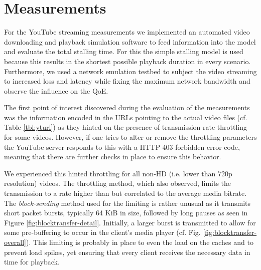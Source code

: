 



\section{Measurements}
\label{sec:measurements}


For the YouTube streaming measurements we implemented an automated video downloading and playback simulation software to feed information into the model and evaluate the total stalling time. For this the simple stalling model is used because this results in the shortest possible playback duration in every scenario. Furthermore, we used a network emulation testbed to subject the video streaming to increased loss and latency while fixing the maximum network bandwidth and observe the influence on the QoE.

The first point of interest discovered during the evaluation of the measurements was the information encoded in the URLs pointing to the actual video files (cf. Table \ref{tbl:yturl}) as they hinted on the presence of transmission rate throttling for some videos. However, if one tries to alter or remove the throttling parameters the YouTube server responds to this with a HTTP 403 forbidden error code, meaning that there are further checks in place to ensure this behavior. 

We experienced this hinted throttling for all non-HD (i.e. lower than 720p resolution) videos. The throttling method, which \cite{alcock2011afcyt} also observed, limits the transmission to a rate higher than but correlated to the average media bitrate. The \textit{block-sending} method used for the limiting is rather unusual as it transmits short packet bursts, typically 64 KiB in size, followed by long pauses as seen in Figure \ref{fig:blocktransfer-detail}. Initially, a larger burst is transmitted to allow for some pre-buffering to occur in the client's media player (cf. Fig. \ref{fig:blocktransfer-overall}). This limiting is probably in place to even the load on the caches and to prevent load spikes, yet ensuring that every client receives the necessary data in time for playback.



